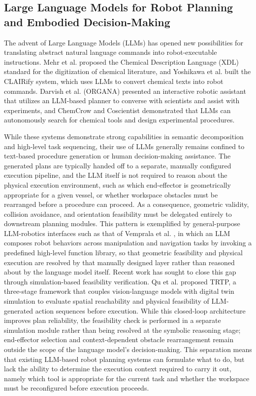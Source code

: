\documentclass{ieeeaccess}
\begin{document}
\subsection{Large Language Models for Robot Planning and Embodied Decision-Making}\label{sec:2.3}
The advent of Large Language Models (LLMs) has opened new possibilities for translating abstract natural language commands into robot-executable instructions. Mehr et al. \cite{ref18} proposed the Chemical Description Language (XDL) standard for the digitization of chemical literature, and Yoshikawa et al. \cite{ref17} built the CLAIRify system, which uses LLMs to convert chemical texts into robot commands. Darvish et al. (ORGANA) \cite{darvish2025organa} presented an interactive robotic assistant that utilizes an LLM-based planner to converse with scientists and assist with experiments, and ChemCrow \cite{ref19} and Coscientist \cite{ref20} demonstrated that LLMs can autonomously search for chemical tools and design experimental procedures.

While these systems demonstrate strong capabilities in semantic decomposition and high-level task sequencing, their use of LLMs generally remains confined to text-based procedure generation or human decision-making assistance. The generated plans are typically handed off to a separate, manually configured execution pipeline, and the LLM itself is not required to reason about the physical execution environment, such as which end-effector is geometrically appropriate for a given vessel, or whether workspace obstacles must be rearranged before a procedure can proceed. As a consequence, geometric validity, collision avoidance, and orientation feasibility must be delegated entirely to downstream planning modules. This pattern is exemplified by general-purpose LLM-robotics interfaces such as that of Vemprala et al. \cite{vemprala2024chatgpt}, in which an LLM composes robot behaviors across manipulation and navigation tasks by invoking a predefined high-level function library, so that geometric feasibility and physical execution are resolved by that manually designed layer rather than reasoned about by the language model itself. Recent work has sought to close this gap through simulation-based feasibility verification. Qu et al. \cite{qu2026trtp} proposed TRTP, a three-stage framework that couples vision-language models with digital twin simulation to evaluate spatial reachability and physical feasibility of LLM-generated action sequences before execution. While this closed-loop architecture improves plan reliability, the feasibility check is performed in a separate simulation module rather than being resolved at the symbolic reasoning stage; end-effector selection and context-dependent obstacle rearrangement remain outside the scope of the language model's decision-making. This separation means that existing LLM-based robot planning systems can formulate what to do, but lack the ability to determine the execution context required to carry it out, namely which tool is appropriate for the current task and whether the workspace must be reconfigured before execution proceeds.
\end{document}
